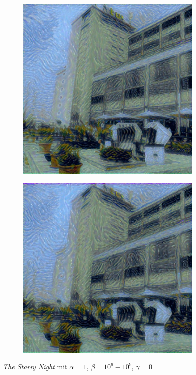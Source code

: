 \begin{figure}[H]
\begin{subfigure}[h]{0.24\textwidth}
    \end{subfigure}
    \begin{subfigure}[h]{0.24\textwidth}
        \centering
        \includegraphics[width=\textwidth]{resources/content/experiments/a__starry_night__768x768__style-weight_1e+08__tv-weight_0e+00.jpg}
    \end{subfigure}
    \begin{subfigure}[h]{0.24\textwidth}
        \centering
        \includegraphics[width=\textwidth]{resources/content/experiments/a__starry_night__768x768__style-weight_1e+09__tv-weight_0e+00.jpg}
    \end{subfigure}
    \caption{\textit{The Starry Night} mit $ \alpha = 1 $, $ \beta = 10^{6} - 10^{9} $, $ \gamma = 0 $}
\end{figure}

